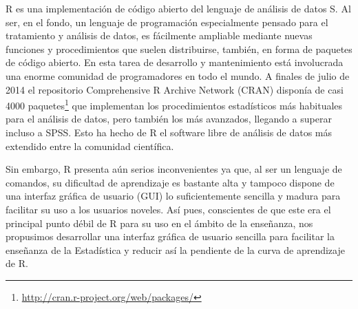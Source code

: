 \documentclass[10pt,twoside,spanish]{article}
\numberwithin{equation}{section}
\begin{document}
R es una implementación de código abierto del lenguaje de análisis de datos S.
Al ser, en el fondo, un lenguaje de programación especialmente pensado para el tratamiento y análisis de datos, es fácilmente ampliable
mediante nuevas funciones y procedimientos que suelen distribuirse, también, en forma de paquetes de código
abierto.
En esta tarea de desarrollo y mantenimiento está involucrada una enorme comunidad de programadores en todo el mundo. 
A finales de julio de 2014 el repositorio Comprehensive R Archive Network (CRAN) disponía de casi 4000
paquetes\footnote{\url{http://cran.r-project.org/web/packages/}} que implementan los procedimientos estadísticos más habituales para el
análisis de datos, pero también los más avanzados, llegando a superar incluso a SPSS. 
Esto ha hecho de R el software libre de análisis de datos más extendido entre la comunidad científica. 

Sin embargo, R presenta aún serios inconvenientes ya que, al ser un lenguaje de comandos, su dificultad de aprendizaje es bastante alta y
tampoco dispone de una interfaz gráfica de usuario (GUI) lo suficientemente sencilla y madura para facilitar su uso a los usuarios noveles.
Así pues, conscientes de que este era el principal punto débil de R para su uso en el ámbito de la enseñanza, nos propusimos desarrollar una
interfaz gráfica de usuario sencilla para facilitar la enseñanza de la Estadística y reducir así la pendiente de la curva de aprendizaje
de R.
\end{document}
